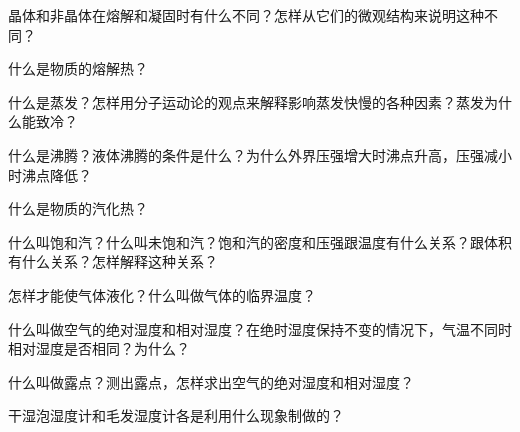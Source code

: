 \begin{Review}
\begin{question}
	\item 晶体和非晶体在熔解和凝固时有什么不同？怎样从它们的微观结构来说明这种不同？
	\item 什么是物质的熔解热？
	\item 什么是蒸发？怎样用分子运动论的观点来解释影响蒸发快慢的各种因素？蒸发为什么能致冷？
	\item 什么是沸腾？液体沸腾的条件是什么？为什么外界压强增大时沸点升高，压强减小时沸点降低？
	\item 什么是物质的汽化热？
	\item 什么叫饱和汽？什么叫未饱和汽？饱和汽的密度和压强跟温度有什么关系？跟体积有什么关系？怎样解释这种关系？
	\item 怎样才能使气体液化？什么叫做气体的临界温度？
	\item 什么叫做空气的绝对湿度和相对湿度？在绝时湿度保持不变的情况下，气温不同时相对湿度是否相同？为什么？
	\item 什么叫做露点？测出露点，怎样求出空气的绝对湿度和相对湿度？
	\item 干湿泡湿度计和毛发湿度计各是利用什么现象制做的？
\end{question}
\end{Review}